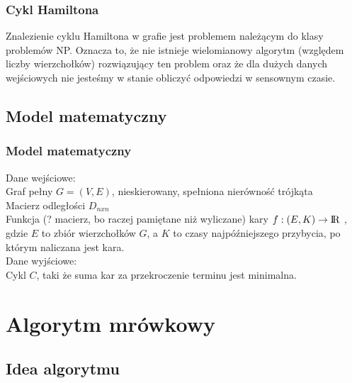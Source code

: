 \documentclass{beamer}
\begin{document}
\begin{frame}
\frametitle{Cykl Hamiltona}
Znalezienie cyklu Hamiltona w grafie jest problemem należącym do klasy problemów NP.
Oznacza to, że nie istnieje wielomianowy algorytm (względem liczby wierzchołków) rozwiązujący ten problem oraz że dla dużych danych wejściowych nie jesteśmy w stanie obliczyć odpowiedzi w sensownym czasie.

\end{frame}

\subsection{Model matematyczny}
\begin{frame}
\frametitle{Model matematyczny}
Dane wejściowe: \\
Graf pełny $G=(V,E)$, nieskierowany, spełniona nierówność trójkąta  \\
Macierz odległości $D_{nxn}$ \\
Funkcja (? macierz, bo raczej pamiętane niż wyliczane) kary $ f : (E,K) \rightarrow {\rm I\!R} $ , gdzie $E$ to zbiór wierzchołków $G$, a $K$ to czasy najpóźniejszego przybycia, po którym naliczana jest kara.
\\
Dane wyjściowe: \\
Cykl $C$, taki że suma kar za przekroczenie terminu jest minimalna.
\end{frame}



\section{Algorytm mrówkowy}

\subsection{Idea algorytmu}
\end{document}
